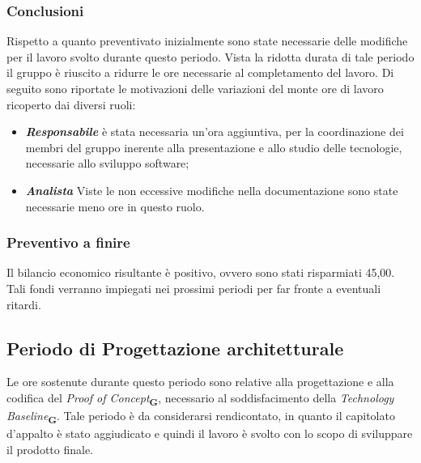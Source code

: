 \subsubsection{Conclusioni}
Rispetto a quanto preventivato inizialmente sono state necessarie delle modifiche per il lavoro svolto durante questo periodo. Vista la ridotta durata di tale periodo il gruppo è riuscito a ridurre le ore necessarie al completamento del lavoro. Di seguito sono riportate le motivazioni delle variazioni del monte ore di lavoro ricoperto dai diversi ruoli:
\begin{itemize}
    \item \textbf{\textit{Responsabile}} è stata necessaria un'ora aggiuntiva, per la coordinazione dei membri del gruppo inerente alla presentazione e allo studio delle tecnologie, necessarie allo sviluppo software;
    \item \textbf{\textit{Analista}} Viste le non eccessive modifiche nella documentazione sono state necessarie meno ore in questo ruolo.
\end{itemize}

\subsubsection{Preventivo a finire} Il bilancio economico risultante è positivo, ovvero sono stati risparmiati 45,00\EURdig. Tali fondi verranno impiegati nei prossimi periodi per far fronte a eventuali ritardi.

\newpage
\subsection{Periodo di Progettazione architetturale}
Le ore sostenute durante questo periodo sono relative alla progettazione e alla codifica del \textit{Proof of Concept}\textsubscript{\textbf{G}}, necessario al soddisfacimento della \textit{Technology Baseline}\textsubscript{\textbf{G}}. Tale periodo è da considerarsi rendicontato, in quanto il capitolato d'appalto è stato aggiudicato e quindi il lavoro è svolto con lo scopo di sviluppare il prodotto finale.

